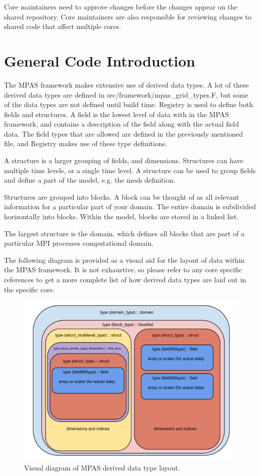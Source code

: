 \documentclass[11pt]{report}
\begin{document}
Core maintainers need to approve changes before the changes appear on the
shared repository. Core maintainers are also responsible for reviewing changes
to shared code that affect multiple cores.

\section{General Code Introduction}
\label{sec:code_intro}
The MPAS framework makes extensive use of derived data types. A lot of these
derived data types are defined in src/framework/mpas\_grid\_types.F, but some
of the data types are not defined until build time. Registry is used to define
both fields and structures. A field is the lowest level of data with in the
MPAS framework, and contains a description of the field along with the actual
field data. The field types that are allowed are defined in the previously
mentioned file, and Registry makes use of these type definitions.

A structure is a larger grouping of fields, and dimensions. Structures can have
multiple time levels, or a single time level. A structure can be used to group
fields and define a part of the model, e.g. the mesh definition.

Structures are grouped into blocks. A block can be thought of as all relevant
information for a particular part of your domain. The entire domain is
subdivided horizontally into blocks. Within the model, blocks are stored in a
linked list.

The largest structure is the domain, which defines all blocks that are part of
a particular MPI processes computational domain. 

The following diagram is provided as a visual aid for the layout of data within
the MPAS framework. It is not exhaustive, so please refer to any core specific
references to get a more complete list of how derived data types are laid out
in the specific core.

\begin{figure}[htp!]
	\includegraphics[scale=0.5]{figures/ddt_diagram.pdf}
	\caption{Visual diagram of MPAS derived data type layout.}
	\label{fig:ddt_diagram}
\end{figure}
\FloatBarrier
\end{document}
